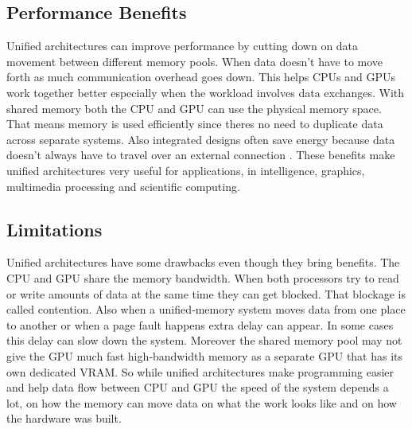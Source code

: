 \subsection{Performance Benefits}
Unified architectures can improve performance by cutting down on data movement between different memory pools. 
When data doesn't have to move forth as much communication overhead goes down. This helps CPUs and GPUs work 
together better especially when the workload involves data exchanges. With shared memory both the CPU and GPU 
can use the physical memory space. That means memory is used efficiently since theres no need to duplicate 
data across separate systems. Also integrated designs often save energy because data doesn’t always have to 
travel over an external connection \cite{u_01} \cite{u_02}. These benefits make unified architectures very useful for 
applications, in intelligence, graphics, multimedia processing and scientific computing.

\subsection{Limitations}
Unified architectures have some drawbacks even though they bring benefits. The CPU and GPU share the memory 
bandwidth. When both processors try to read or write amounts of data at the same time they can get blocked. 
That blockage is called contention. Also when a unified‑memory system moves data from one place to another 
or when a page fault happens extra delay can appear. In some cases this delay can slow down the system. 
Moreover the shared memory pool may not give the GPU much fast high‑bandwidth memory as a separate GPU that 
has its own dedicated VRAM. So while unified architectures make programming easier and help data flow between 
CPU and GPU the speed of the system depends a lot, on how the memory can move data on what the work looks 
like and on how the hardware was built.